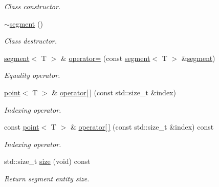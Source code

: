 \begin{DoxyCompactItemize}
\begin{DoxyCompactList}\small\item\em Class constructor. \end{DoxyCompactList}\item 
\mbox{\label{classddd_1_1segment_a90f0a91b7cf1e39d8c385ff23bd6af5d}} 
\hyperlink{classddd_1_1segment_a90f0a91b7cf1e39d8c385ff23bd6af5d}{$\sim$segment} ()
\begin{DoxyCompactList}\small\item\em Class destructor. \end{DoxyCompactList}\item 
\hyperlink{classddd_1_1segment}{segment}$<$ T $>$ \& \hyperlink{classddd_1_1segment_a9c33e619d61ee3fc61a7767ebc2948f5}{operator=} (const \hyperlink{classddd_1_1segment}{segment}$<$ T $>$ \&\hyperlink{classddd_1_1segment}{segment})
\begin{DoxyCompactList}\small\item\em Equality operator. \end{DoxyCompactList}\item 
\hyperlink{classddd_1_1point}{point}$<$ T $>$ \& \hyperlink{classddd_1_1segment_a38fb73f1bb682c0446eef1cce0cb5f21}{operator\mbox{[}$\,$\mbox{]}} (const std\+::size\+\_\+t \&index)
\begin{DoxyCompactList}\small\item\em Indexing operator. \end{DoxyCompactList}\item 
const \hyperlink{classddd_1_1point}{point}$<$ T $>$ \& \hyperlink{classddd_1_1segment_a7f491fcefb2c3d8f805b7a27ed93395f}{operator\mbox{[}$\,$\mbox{]}} (const std\+::size\+\_\+t \&index) const
\begin{DoxyCompactList}\small\item\em Indexing operator. \end{DoxyCompactList}\item 
\mbox{\label{classddd_1_1segment_a4337f5736c0e63ff90f4ecf69131d648}} 
std\+::size\+\_\+t \hyperlink{classddd_1_1segment_a4337f5736c0e63ff90f4ecf69131d648}{size} (void) const
\begin{DoxyCompactList}\small\item\em Return segment entity size. \end{DoxyCompactList}\end{DoxyCompactItemize}


